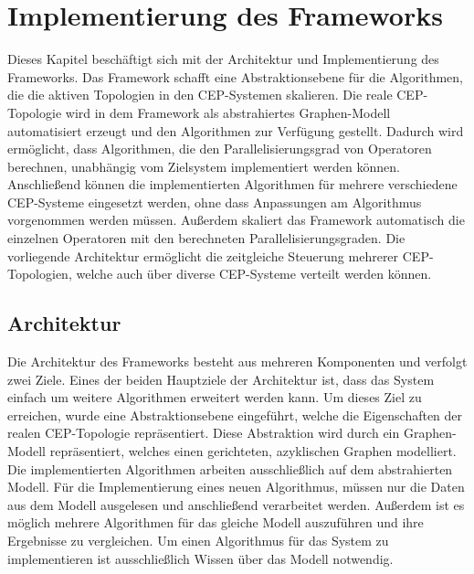 \chapter{Implementierung des Frameworks}

Dieses Kapitel beschäftigt sich mit der Architektur und Implementierung des Frameworks.
Das Framework schafft eine Abstraktionsebene für die Algorithmen, die die aktiven Topologien in den CEP-Systemen skalieren.
Die reale CEP-Topologie wird in dem Framework als abstrahiertes Graphen-Modell automatisiert erzeugt und den Algorithmen zur Verfügung gestellt.
Dadurch wird ermöglicht, dass Algorithmen, die den Parallelisierungsgrad von Operatoren berechnen, unabhängig vom Zielsystem implementiert werden können.
Anschließend können die implementierten Algorithmen für mehrere verschiedene CEP-Systeme eingesetzt werden, ohne dass Anpassungen am Algorithmus vorgenommen werden müssen.
Außerdem skaliert das Framework automatisch die einzelnen Operatoren mit den berechneten Parallelisierungsgraden.
Die vorliegende Architektur ermöglicht die zeitgleiche Steuerung mehrerer CEP-Topologien, welche auch über diverse CEP-Systeme verteilt werden können. 

\section{Architektur}

Die Architektur des Frameworks besteht aus mehreren Komponenten und verfolgt zwei Ziele.
Eines der beiden Hauptziele der Architektur ist, dass das System einfach um weitere Algorithmen erweitert werden kann.
Um dieses Ziel zu erreichen, wurde eine Abstraktionsebene eingeführt, welche die Eigenschaften der realen CEP-Topologie repräsentiert.
Diese Abstraktion wird durch ein Graphen-Modell repräsentiert, welches einen gerichteten, azyklischen Graphen modelliert.
Die implementierten Algorithmen arbeiten ausschließlich auf dem abstrahierten Modell.
Für die Implementierung eines neuen Algorithmus, müssen nur die Daten aus dem Modell ausgelesen und anschließend verarbeitet werden.
Außerdem ist es möglich mehrere Algorithmen für das gleiche Modell auszuführen und ihre Ergebnisse zu vergleichen.
Um einen Algorithmus für das System zu implementieren ist ausschließlich Wissen über das Modell notwendig.

